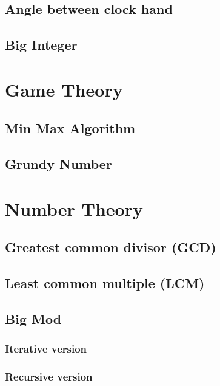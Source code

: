 \documentclass[11pt]{report}
\begin{document}
\section{Angle between clock hand}

\section{Big Integer}



\chapter{Game Theory}
\section{Min Max Algorithm}

\newpage
\section{Grundy Number}


\chapter{Number Theory}
\section{Greatest common divisor (GCD)}

\section{Least common multiple (LCM)}

\section{Big Mod}
\subsection{Iterative version}

\subsection{Recursive version}

\end{document}
